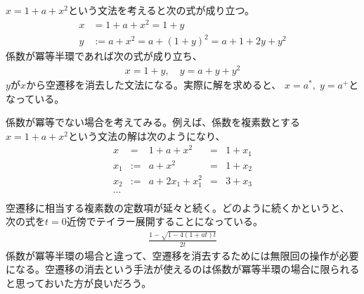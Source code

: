 {	$x=1+a+x^2$という文法を考えると次の式が成り立つ。
	\begin{equation*}\begin{split}
		x &= 1 + a + x^2 = 1 + y \\
		y &:= a + x^2 = a + (1 + y)^2 = a + 1 + 2y + y^2
	\end{split}\end{equation*}
	係数が冪等半環であれば次の式が成り立ち、
	\begin{equation*}\begin{split}
		x = 1 + y,\quad y = a + y + y^2
	\end{split}\end{equation*}
	$y$が$x$から空遷移を消去した文法になる。実際に解を求めると、
	$x = a^*,\; y = a^+$となっている。

	係数が冪等でない場合を考えてみる。例えば、係数を複素数とする
	$x=1+a+x^2$という文法の解は次のようになり、
	\begin{equation*}\begin{array}{rclcl}
		x &=& 1 + a + x^2 &=& 1 + x_1 \\
		x_1 &:=& a + x^2 &=& 1 + x_2 \\
		x_2 &:=& a + 2x_1 + x_1^2 &=& 3 + x_3 \\
		\cdots \\
	\end{array}\end{equation*}
	空遷移に相当する複素数の定数項が延々と続く。どのように続くかというと、
	次の式を$t=0$近傍でテイラー展開することになっている。
	\begin{equation*}\begin{split}
		\frac{1 - \sqrt{1 - 4(1+at)t}}{2t}
	\end{split}\end{equation*}
	係数が冪等半環の場合と違って、空遷移を消去するためには無限回の操作が必要
	になる。空遷移の消去という手法が使えるのは係数が冪等半環の場合に限られる
	と思っておいた方が良いだろう。
}
